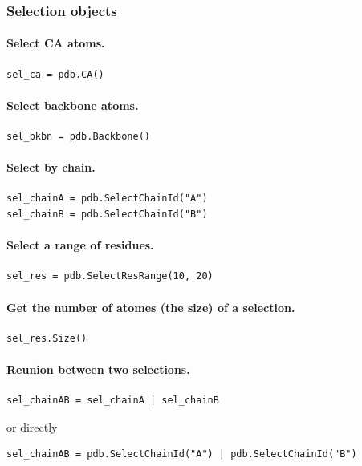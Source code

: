 \documentclass[12pt,a4paper]{article}
\begin{document}
\subsubsection{Selection objects}

\paragraph{Select CA atoms.}
\begin{verbatim}
sel_ca = pdb.CA()
\end{verbatim}


\paragraph{Select backbone atoms.}
\begin{verbatim}
sel_bkbn = pdb.Backbone()
\end{verbatim}


\paragraph{Select by chain.}
\begin{verbatim}
sel_chainA = pdb.SelectChainId("A")
sel_chainB = pdb.SelectChainId("B")
\end{verbatim}


\paragraph{Select a range of residues.}
\begin{verbatim}
sel_res = pdb.SelectResRange(10, 20)
\end{verbatim}


\paragraph{Get the number of atomes (the size) of a selection.}
\begin{verbatim}
sel_res.Size()
\end{verbatim}



\paragraph{Reunion between two selections.}
\begin{verbatim}
sel_chainAB = sel_chainA | sel_chainB
\end{verbatim}
or directly
\begin{verbatim}
sel_chainAB = pdb.SelectChainId("A") | pdb.SelectChainId("B")
\end{verbatim}
\end{document}
